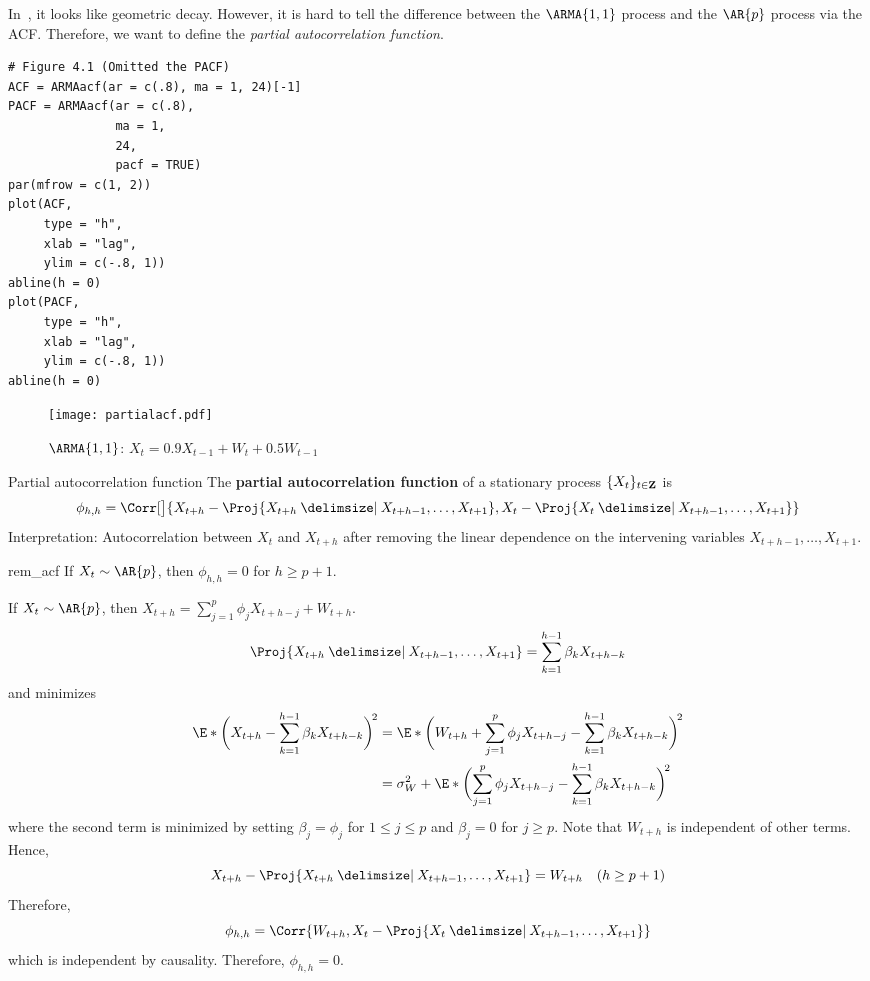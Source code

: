 In~, it looks like geometric decay. However, it is hard to tell
the difference between the $ \ARMA{1,1} $ process and the $ \AR{p} $ process
via the ACF\@. Therefore, we want to define the \emph{partial autocorrelation function}.
\begin{verbatim}
# Figure 4.1 (Omitted the PACF)
ACF = ARMAacf(ar = c(.8), ma = 1, 24)[-1]
PACF = ARMAacf(ar = c(.8),
               ma = 1,
               24,
               pacf = TRUE)
par(mfrow = c(1, 2))
plot(ACF,
     type = "h",
     xlab = "lag",
     ylim = c(-.8, 1))
abline(h = 0)
plot(PACF,
     type = "h",
     xlab = "lag",
     ylim = c(-.8, 1))
abline(h = 0)
\end{verbatim}
\begin{figure}[!htbp]
    \centering
    \texttt{[image: partialacf.pdf]}
    \caption{$ \ARMA{1,1} $: $ X_t=0.9X_{t-1}+W_t+0.5W_{t-1} $}\label{fig:partialacf}
\end{figure}
\begin{Definition}{Partial autocorrelation function}{}
    The \textbf{partial autocorrelation function} of a stationary
    process $ \{X_t\}_{t\in\mathbf{Z}} $ is
    \[ \phi_{h,h}=\Corr[\big]{X_{t+h}-\Proj{X_{t+h}\onto X_{t+h-1},\ldots,X_{t+1}},
        X_{t}-\Proj{X_t\onto X_{t+h-1},\ldots,X_{t+1}}} \]
    Interpretation: Autocorrelation between $ X_t $ and $ X_{t+h} $
    after removing the linear dependence on the intervening variables $ X_{t+h-1},\ldots,X_{t+1} $.
\end{Definition}
\begin{Remark}{}{rem_acf}
    If $ X_t \sim \AR{p} $, then $ \phi_{h,h}=0 $ for $ h\ge p+1 $.
\end{Remark}
\begin{Proof}{}{}
    If $ X_t \sim \AR{p} $, then $ X_{t+h}=\sum_{j=1}^{p} \phi_j X_{t+h-j} +W_{t+h} $.
    \[ \Proj{X_{t+h}\onto X_{t+h-1},\ldots,X_{t+1}}=
        \sum_{k=1}^{h-1}\beta_k X_{t+h-k}  \]
    and minimizes
    \begin{align*}
        \E*{\biggl(X_{t+h}-\sum_{k=1}^{h-1} \beta_k X_{t+h-k}\biggr)^{\!2}}
         & =\E*{\biggl(W_{t+h}+\sum_{j=1}^{p} \phi_j X_{t+h-j}
        -\sum_{k=1}^{h-1} \beta_k X_{t+h-k}\biggr)^{\!2}}                                                          \\
         & =\sigma_W^2+\E*{\biggl(\sum_{j=1}^{p} \phi_j X_{t+h-j}-\sum_{k=1}^{h-1} \beta_k X_{t+h-k}\biggr)^{\!2}}
    \end{align*}
    where the second term is minimized by setting $ \beta_j=\phi_j $ for $ 1\le j\le p $
    and $ \beta_j=0 $ for $ j\ge p $. Note that $ W_{t+h} $ is independent of other terms.
    Hence,
    \[ X_{t+h}-\Proj{X_{t+h}\onto X_{t+h-1},\ldots,X_{t+1}}=W_{t+h}\quad(h\ge p+1) \]
    Therefore,
    \[ \phi_{h,h}=\Corr{W_{t+h},X_t-\Proj{X_t\onto X_{t+h-1},\ldots,X_{t+1}}} \]
    which is independent by causality. Therefore, $ \phi_{h,h}=0 $.
\end{Proof}
